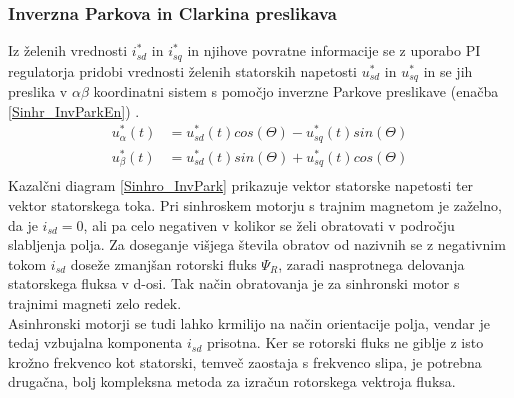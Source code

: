 \documentclass[a4paper,twoside,openright,12pt]{book}
\begin{document}
\subsubsection{Inverzna Parkova in Clarkina preslikava}
Iz želenih vrednosti $i^*_{sd}$ in $i^*_{sq}$ in njihove povratne informacije se z uporabo PI regulatorja pridobi vrednosti želenih statorskih napetosti $u^*_{sd}$ in $u^*_{sq}$ in se jih preslika v $\alpha \beta$ koordinatni sistem s pomočjo inverzne Parkove preslikave (enačba \ref{Sinhr_InvParkEn}) \cite{instruments1998field}.
\begin{equation} \label{Sinhr_InvParkEn}
\begin{aligned}
u^*_{\alpha}(t) &= u^*_{sd}(t)cos(\Theta)-u^*_{sq}(t)sin(\Theta)\\[5pt]
u^*_{\beta}(t) &= u^*_{sd}(t)sin(\Theta)+u^*_{sq}(t)cos(\Theta)\\[5pt]
\end{aligned}
\end{equation}
Kazalčni diagram \ref{Sinhro_InvPark} prikazuje vektor statorske napetosti ter vektor statorskega  toka. Pri sinhroskem motorju s trajnim magnetom je zaželno, da je $i_{sd}=0$, ali pa celo negativen v kolikor se želi obratovati v področju slabljenja polja. Za doseganje višjega števila obratov od nazivnih se z negativnim tokom $i_{sd}$ doseže zmanjšan rotorski fluks $\Psi_R$, zaradi nasprotnega delovanja statorskega fluksa v d-osi. Tak način obratovanja je za sinhronski motor s trajnimi magneti zelo redek.\\
Asinhronski motorji se tudi lahko krmilijo na način orientacije polja, vendar je tedaj vzbujalna komponenta $i_{sd}$ prisotna. Ker se rotorski fluks ne giblje z isto krožno frekvenco kot statorski, temveč zaostaja s frekvenco slipa, je potrebna drugačna, bolj kompleksna metoda za izračun rotorskega vektroja fluksa.  
\end{document}
